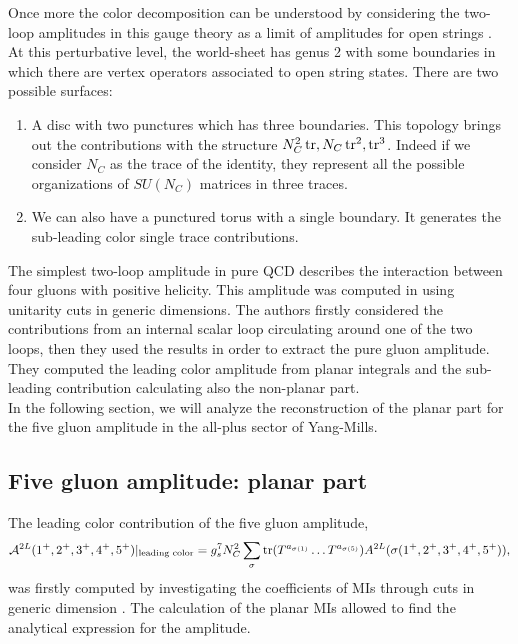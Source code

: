 Once more the color decomposition can be understood by considering the two-loop amplitudes in this gauge theory as a limit of amplitudes for open strings \cite{PhysRevD.101.076001}. At this perturbative level, the world-sheet has genus 2 with some boundaries in which there are vertex operators associated to open string states. There are two possible surfaces:
\begin{enumerate}
	\item A disc with two punctures which has three boundaries. This topology brings out the contributions with the structure $N_C^2 \tr, N_C \tr^2, \tr^3$. Indeed if we consider $N_C$ as the trace of the identity, they represent all the possible organizations of $SU(N_C)$ matrices in three traces.
	\item We can also have a punctured torus with a single boundary. It generates the sub-leading color single trace contributions.
\end{enumerate}
The simplest two-loop amplitude in pure QCD describes the interaction between four gluons with positive helicity. This amplitude was computed in \cite{2000} using unitarity cuts in generic dimensions. The authors firstly considered the contributions from an internal scalar loop circulating around one of the two loops, then they used the results in order to extract the pure gluon amplitude.  They computed the leading color amplitude from planar integrals and the sub-leading contribution calculating also the non-planar part.\\
In the following section, we will analyze the reconstruction of the planar part for the five gluon amplitude in the all-plus sector of Yang-Mills.
\subsection{Five gluon amplitude: planar part}
The leading color contribution of the five gluon amplitude, $$\mathcal{A}^{2L}(1^+,2^+,3^+,4^+,5^+)|_{\text{leading color}}=g_s^7 N_C^2 \sum_{\sigma} \tr(T^{a_{\sigma(1)}}\dots T^{a_{\sigma(5)}})A^{2L}(\sigma(1^+,2^+,3^+,4^+,5^+)) ,$$ was firstly computed by investigating the coefficients of MIs through cuts in generic dimension \cite{2013}. The calculation of the planar MIs \cite{2016} allowed to find the analytical expression for the amplitude.
